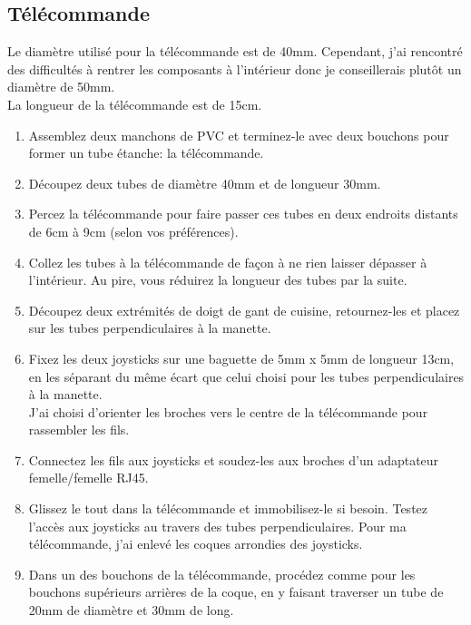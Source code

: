 \documentclass[11pt,a4paper]{article}
\begin{document}
      \subsection{Télécommande}
        Le diamètre utilisé pour la télécommande est de 40mm. Cependant, j'ai rencontré des difficultés à rentrer les composants à l'intérieur donc je conseillerais plutôt un diamètre de 50mm.\\
        La longueur de la télécommande est de 15cm.
        \begin{enumerate}
          \item Assemblez deux manchons de PVC et terminez-le avec deux bouchons pour former un tube étanche: la télécommande.
          
          \item Découpez deux tubes de diamètre 40mm et de longueur 30mm.
          
          \item Percez la télécommande pour faire passer ces tubes en deux endroits distants de 6cm à 9cm (selon vos préférences).
          
          \item Collez les tubes à la télécommande de façon à ne rien laisser dépasser à l'intérieur. Au pire, vous réduirez la longueur des tubes par la suite.
          \item Découpez deux extrémités de doigt de gant de cuisine, retournez-les et placez sur les tubes perpendiculaires à la manette.
          
          \item Fixez les deux joysticks sur une baguette de 5mm x 5mm de longueur 13cm, en les séparant du même écart que celui choisi pour les tubes perpendiculaires à la manette. \\
          J'ai choisi d'orienter les broches vers le centre de la télécommande pour rassembler les fils.
          
          \item Connectez les fils aux joysticks et soudez-les aux broches d'un adaptateur femelle/femelle RJ45.%
          
          \item Glissez le tout dans la télécommande et immobilisez-le si besoin. Testez l'accès aux joysticks au travers des tubes perpendiculaires. Pour ma télécommande, j'ai enlevé les coques arrondies des joysticks.
          
          \item Dans un des bouchons de la télécommande, procédez comme pour les bouchons supérieurs arrières de la coque, en y faisant traverser un tube de 20mm de diamètre et 30mm de long.
          

\end{enumerate}
\end{document}
